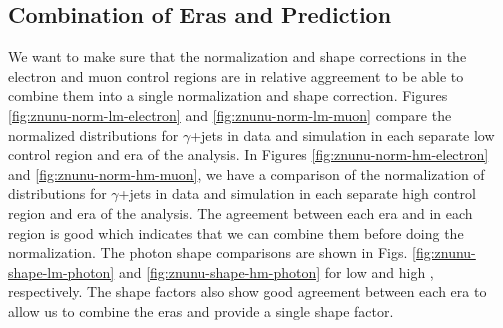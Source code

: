 

\subsection{Combination of Eras and Prediction}\label{subsec:znunucombine}

We want to make sure that the normalization and shape corrections in the electron and muon control regions are in relative aggreement to be able to combine them into a single normalization and shape correction. Figures \ref{fig:znunu-norm-lm-electron} and \ref{fig:znunu-norm-lm-muon} compare the normalized \metgamma{} distributions for $\gamma$+jets in data and simulation in each separate low \dm{} control region and era of the analysis. In Figures \ref{fig:znunu-norm-hm-electron} and \ref{fig:znunu-norm-hm-muon}, we have a comparison of the normalization of \metgamma{} distributions for $\gamma$+jets in data and simulation in each separate high \dm{} control region and era of the analysis. The agreement between each era and in each region is good which indicates that we can combine them before doing the normalization. The photon shape comparisons are shown in Figs. \ref{fig:znunu-shape-lm-photon} and \ref{fig:znunu-shape-hm-photon} for low and high \dm{}, respectively. The shape factors also show good agreement between each era to allow us to combine the eras and provide a single shape factor. 

